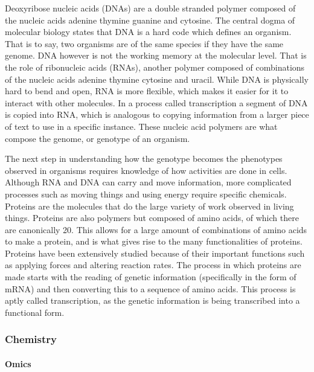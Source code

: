 \documentclass[a4paper,11pt,oneside]{book}
\begin{document}
Deoxyribose nucleic acids (DNAs) are a double stranded polymer composed of the nucleic acids adenine thymine guanine and cytosine. The central dogma of molecular biology states that DNA is a hard code which defines an organism. That is to say, two organisms are of the same species if they have the same genome. DNA however is not the working memory at the molecular level. That is the role of ribonucleic acids (RNAs), another polymer composed of combinations of the nucleic acids adenine thymine cytosine and uracil. While DNA is physically hard to bend and open, RNA is more flexible, which makes it easier for it to interact with other molecules. In a process called transcription a segment of DNA is copied into RNA, which is analogous to copying information from a larger piece of text to use in a specific instance. These nucleic acid polymers are what compose the genome, or genotype of an organism.

The next step in understanding how the genotype becomes the phenotypes observed in organisms requires knowledge of how activities are done in cells. Although RNA and DNA can carry and move information, more complicated processes such as moving things and using energy require specific chemicals. Proteins are the molecules that do the large variety of work observed in living things. Proteins are also polymers but composed of amino acids, of which there are canonically 20. This allows for a large amount of combinations of amino acids to make a protein, and is what gives rise to the many functionalities of proteins. Proteins have been extensively studied because of their important functions such as applying forces and altering reaction rates. The process in which proteins are made starts with the reading of genetic information (specifically in the form of mRNA) and then converting this to a sequence of amino acids. This process is aptly called transcription, as the genetic information is being transcribed into a functional form.

\subsubsection{Chemistry}

\paragraph{Omics}
\end{document}
